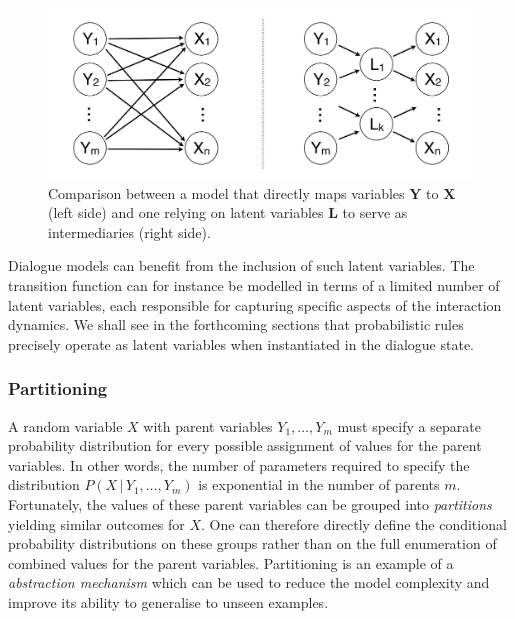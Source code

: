  \begin{figure}[h]
\centering
\includegraphics[scale=0.25]{imgs/latentvariables.pdf}
\caption{Comparison between a model that directly maps variables $\mathbf{Y}$ to $\mathbf{X}$ (left side) and one relying on latent variables $\mathbf{L}$ to serve as intermediaries (right side).}
\label{fig:latentvariables}
\end{figure}

Dialogue models can benefit from the inclusion of such latent variables. The transition function can for instance be modelled in terms of a limited number of latent variables, each responsible for capturing specific aspects of the interaction dynamics.  We shall see in the forthcoming sections that probabilistic rules precisely operate as latent variables when instantiated in the dialogue state. 

\subsubsection*{Partitioning}

A random variable $X$ with parent variables $Y_1,\dots, Y_m$ must specify a separate probability distribution for every possible assignment of values for the parent variables. In other words, the number of parameters required to specify the distribution $P(X \, | \, Y_1, \dots, Y_m)$ is exponential in the number of parents $m$. Fortunately, the values of these parent variables can be grouped into \textit{partitions} yielding similar outcomes for $X$. One can therefore directly define the conditional probability distributions on these groups rather than on the full enumeration of combined values for the parent variables. Partitioning is an example of a \textit{abstraction mechanism} which can be used to reduce the model complexity and improve its ability to generalise to unseen examples. 


